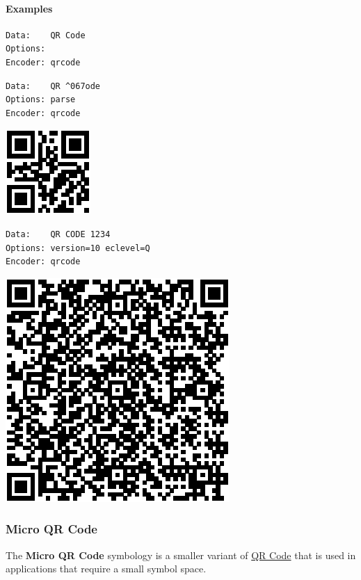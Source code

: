 \hypertarget{examples-13}{%
\paragraph{Examples}\label{examples-13}}

\begin{verbatim}
Data:    QR Code
Options: 
Encoder: qrcode
\end{verbatim}

\begin{verbatim}
Data:    QR ^067ode
Options: parse
Encoder: qrcode
\end{verbatim}

\includegraphics{images/qrcode-1.eps}

\begin{verbatim}
Data:    QR CODE 1234
Options: version=10 eclevel=Q
Encoder: qrcode
\end{verbatim}

\includegraphics{images/qrcode-2.eps}

\hypertarget{micro-qr-code}{%
\subsubsection{Micro QR Code}\label{micro-qr-code}}

The \textbf{Micro QR Code} symbology is a smaller variant of
\protect\hyperlink{qr-code}{QR Code} that is used in applications that
require a small symbol space.

